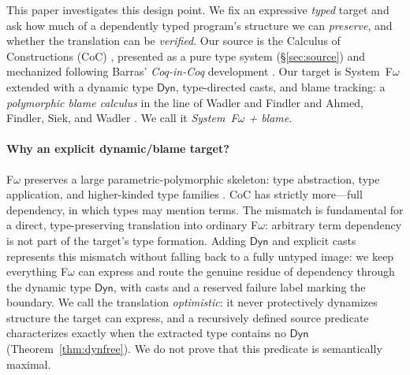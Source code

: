\documentclass[acmsmall,anonymous=false,nonacm]{acmart}
\newcommand{\dyn}{\ensuremath{\mathsf{Dyn}}}
\begin{document}
This paper investigates this design point. We fix an expressive
\emph{typed} target and ask how much of a dependently typed program's structure
we can \emph{preserve}, and whether the translation can be \emph{verified}. Our
source is the Calculus of Constructions (CoC) \cite{coquand1988coc}, presented
as a pure type system (\S\ref{sec:source}) and mechanized following Barras'
\emph{Coq-in-Coq}
development \cite{barras1999,barras1997coqincoq}. Our target is System~F$\omega$
extended with a dynamic type $\dyn$, type-directed casts, and blame tracking:
a \emph{polymorphic blame calculus} in the line of Wadler and Findler
\cite{wadler2009blame} and Ahmed, Findler, Siek, and Wadler
\cite{ahmed2011blame}. We call it \emph{System~F$\omega$ + blame}.

\paragraph{Why an explicit dynamic/blame target?}
F$\omega$ preserves a large parametric-polymorphic skeleton: type
abstraction, type application, and higher-kinded type families
\cite{reynolds1983types}. CoC has strictly more---full dependency, in which
types may mention terms. The mismatch is fundamental for a direct,
type-preserving translation into ordinary F$\omega$: arbitrary term dependency is
not part of the target's type formation. Adding $\dyn$ and explicit casts
represents this mismatch without
falling back to a fully untyped image: we keep everything F$\omega$ can express
and route the genuine residue of dependency through the dynamic type $\dyn$,
with casts and a reserved failure label marking the boundary. We call the
translation \emph{optimistic}: it never protectively dynamizes structure the
target can express, and a recursively defined source predicate characterizes
exactly when the extracted type contains no $\dyn$
(Theorem~\ref{thm:dynfree}). We do not prove that this predicate is
semantically maximal.
\end{document}
